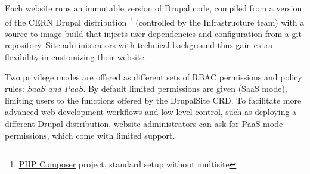 Each website runs an immutable version of Drupal code, compiled from a version of the CERN Drupal distribution
\footnote{\href{https://getcomposer.org/}{PHP Composer} project, standard setup without multisite}
(controlled by the Infrastructure team) with a source-to-image build that injects user dependencies and configuration from a git repository.
Site administrators with technical background thus gain extra flexibility in customizing their website.

Two privilege modes are offered as different sets of RBAC permissions and policy rules: \emph{SaaS and PaaS}.
By default limited permissions are given (SaaS mode), limiting users to the functions offered by the DrupalSite CRD.
To facilitate more advanced web development workflows and low-level control, such as deploying a different Drupal distribution,
website administrators can ask for PaaS mode permissions, which come with limited support.

